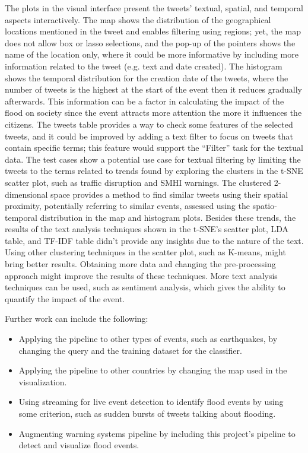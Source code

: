 The plots in the visual interface present the tweets' textual, spatial, and temporal aspects
interactively. The map shows the distribution of the geographical locations mentioned in the tweet
and enables filtering using regions; yet, the map does not allow box or lasso selections, and the
pop-up of the pointers shows the name of the location only, where it could be more informative by
including more information related to the tweet (e.g. text and date created). The histogram shows
the temporal distribution for the creation date of the tweets, where the number of tweets is the
highest at the start of the event then it reduces gradually afterwards. This information can be a
factor in calculating the impact of the flood on society since the event attracts more attention the
more it influences the citizens. The tweets table provides a way to check some features of the
selected tweets, and it could be improved by adding a text filter to focus on tweets that contain
specific terms; this feature would support the ``Filter'' task for the textual data. The test cases
show a potential use case for textual filtering by limiting the tweets to the terms related to
trends found by exploring the clusters in the \ac{t-SNE} scatter plot, such as traffic disruption
and \ac{SMHI} warnings. The clustered 2-dimensional space provides a method to find similar tweets
using their spatial proximity, potentially referring to similar events, assessed using the
spatio-temporal distribution in the map and histogram plots. Besides these trends, the results of
the text analysis techniques shown in the \ac{t-SNE}'s scatter plot, \ac{LDA} table, and \ac{TF-IDF}
table didn't provide any insights due to the nature of the text. Using other clustering techniques
in the scatter plot, such as K-means, might bring better results. Obtaining more data and changing
the pre-processing approach might improve the results of these techniques. More text analysis
techniques can be used, such as sentiment analysis, which gives the ability to quantify the impact
of the event.

Further work can include the following:
\begin{itemize}
  \item Applying the pipeline to other types of events, such as earthquakes, by changing the query
    and the training dataset for the classifier.
  \item Applying the pipeline to other countries by changing the map used in the visualization.
  \item Using streaming for live event detection to identify flood events by using some criterion,
    such as sudden bursts of tweets talking about flooding.
  \item Augmenting warning systems pipeline by including this project's pipeline to detect and visualize flood events.
\end{itemize}
